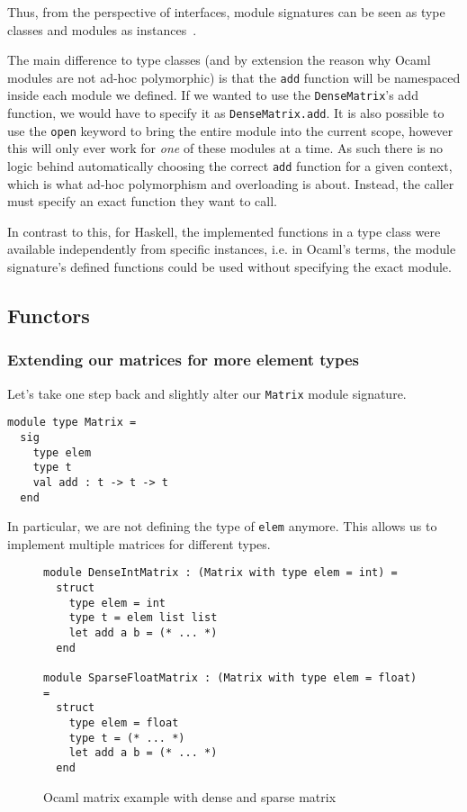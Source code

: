 Thus, from the perspective of interfaces, module signatures can be seen as type classes and modules as instances~\cite{modular-type-classes}.

The main difference to type classes (and by extension the reason why Ocaml modules are not ad-hoc polymorphic) is that the \verb|add| function will be namespaced inside each module we defined. If we wanted to use the \verb|DenseMatrix|'s add function, we would have to specify it as \verb|DenseMatrix.add|. It is also possible to use the \verb|open| keyword to bring the entire module into the current scope, however this will only ever work for \textit{one} of these modules at a time. As such there is no logic behind automatically choosing the correct \verb|add| function for a given context, which is what ad-hoc polymorphism and overloading is about. Instead, the caller must specify an exact function they want to call.

In contrast to this, for Haskell, the implemented functions in a type class were available independently from specific instances, i.e. in Ocaml's terms, the module signature's defined functions could be used without specifying the exact module.

\subsection{Functors}

\subsubsection{Extending our matrices for more element types}

Let's take one step back and slightly alter our \verb|Matrix| module signature.
\begin{verbatim}
module type Matrix =
  sig
    type elem
    type t
    val add : t -> t -> t
  end
\end{verbatim}
In particular, we are not defining the type of \verb|elem| anymore. This allows us to implement multiple matrices for different types.

\begin{figure*}
\begin{verbatim}
module DenseIntMatrix : (Matrix with type elem = int) =
  struct
    type elem = int
    type t = elem list list
    let add a b = (* ... *)
  end

module SparseFloatMatrix : (Matrix with type elem = float) =
  struct
    type elem = float
    type t = (* ... *)
    let add a b = (* ... *)
  end
\end{verbatim}
\caption{Ocaml matrix example with dense and sparse matrix}
\label{ocaml-all-matrix}
\end{figure*}

